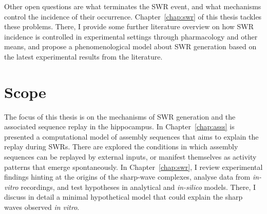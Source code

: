 
    Other open questions are what terminates the SWR event, and what
    mechanisms control the incidence of their occurrence.
    Chapter~\ref{chap:swr} of this thesis tackles these problems. There, I
    provide some further literature overview on how SWR incidence is controlled
    in experimental settings through pharmacology and other means, and propose
    a phenomenological model about SWR generation based on the latest
    experimental results from the literature.

\section{Scope}
  The focus of this thesis is on the mechanisms of SWR generation and the
  associated sequence replay in the hippocampus. In Chapter~\ref{chap:asss} is
  presented a computational model of assembly sequences that aims to explain the
  replay during SWRs. There are explored the conditions in which assembly sequences
  can be replayed by external inputs, or manifest themselves as activity
  patterns that emerge spontaneously. In Chapter~\ref{chap:swr}, I review
  experimental findings hinting at the origins of the sharp-wave complexes,
  analyse data from \textit{in-vitro} recordings, and test hypotheses in
  analytical and \textit{in-silico} models. There, I discuss in detail a
  minimal hypothetical model that could explain the sharp waves observed
  \textit{in vitro}. 
  

